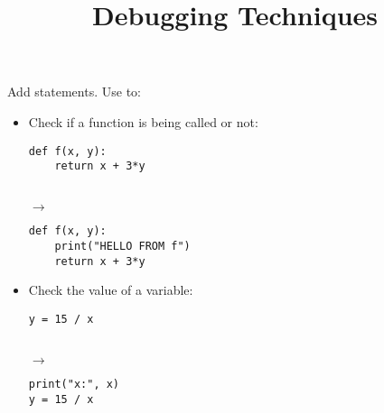 \documentclass{handout}
\title{Debugging Techniques}
\begin{document}
\section{}

Add  statements. Use to:

\begin{itemize}

\item Check if a function is being called or not: \\
\noindent
\begin{minipage}[t]{0.45\columnwidth}
\begin{lstlisting}
def f(x, y):
    return x + 3*y
\end{lstlisting}
\end{minipage}
\begin{minipage}[t]{0.05\columnwidth}
\  \\
\hspace*{1ex}$\rightarrow$
\end{minipage}
\begin{minipage}[t]{0.45\columnwidth}
\begin{lstlisting}
def f(x, y):
    print("HELLO FROM f")
    return x + 3*y
\end{lstlisting}
\end{minipage}

\item Check the value of a variable: \\
\noindent
\begin{minipage}[t]{0.45\columnwidth}
\begin{lstlisting}
y = 15 / x
\end{lstlisting}
\end{minipage}
\begin{minipage}[t]{0.05\columnwidth}
\  \\
\hspace*{1ex}$\rightarrow$
\end{minipage}
\begin{minipage}[t]{0.45\columnwidth}
\begin{lstlisting}
print("x:", x)
y = 15 / x
\end{lstlisting}
\end{minipage}


\end{itemize}
\end{document}
